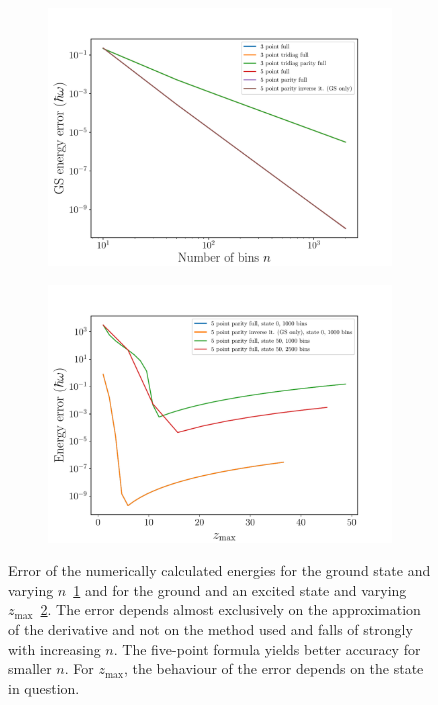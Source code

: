 \documentclass[a4paper,DIV=12,english]{scrartcl}
\begin{document}
\begin{figure}
    \centering
    \begin{subfigure}{0.49\textwidth}
        \centering
        \includegraphics[width=\textwidth]{../plots/bench/bench_err.pdf}
        \caption{}
        \label{subfig:bench_err_n}
    \end{subfigure}
    \begin{subfigure}{0.49\textwidth}
        \centering
        \includegraphics[width=\textwidth]{../plots/bench/bench_xmax_err.pdf}
        \caption{}
        \label{subfig:bench_err_zmax}
    \end{subfigure}
    \caption{Error of the numerically calculated energies for the ground state and varying $n$~\ref{subfig:bench_err_n} and for the ground and an excited state and varying $z_\text{max}$~\ref{subfig:bench_err_zmax}. The error depends almost exclusively on the approximation of the derivative and not on the method used and falls of strongly with increasing $n$. The five-point formula yields better accuracy for smaller $n$. For $z_\text{max}$, the behaviour of the error depends on the state in question.}
    \label{fig:bench_err}
\end{figure}
\end{document}
